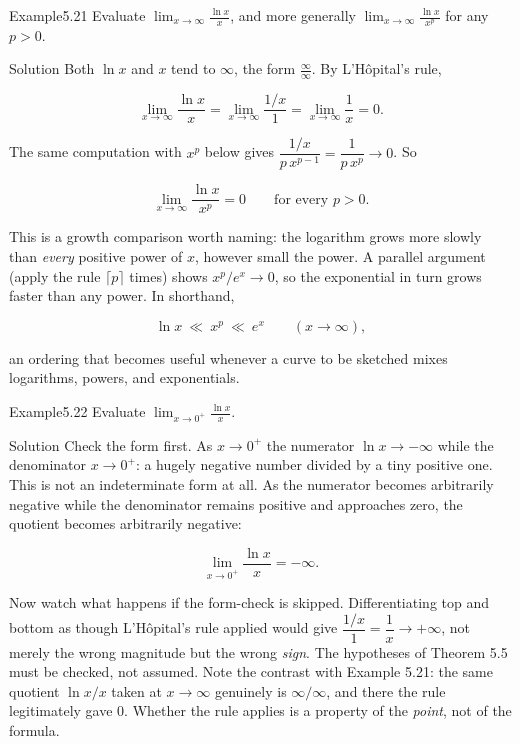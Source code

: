 \documentclass[a4paper,12pt,oneside]{memoir}
\begin{document}
\begin{workedexample}
\begin{envexample}{Example}{5.21}{}
Evaluate \(\displaystyle \lim_{x \to \infty} \frac{\ln x}{x}\), and more generally \(\displaystyle \lim_{x \to \infty} \frac{\ln x}{x^{p}}\) for any \(p > 0\).
\end{envexample}
\begin{envsolution}{Solution}{}{}
Both \(\ln x\) and \(x\) tend to \(\infty\), the form \(\tfrac{\infty}{\infty}\). By L’Hôpital’s rule,

\[ \lim_{x \to \infty} \frac{\ln x}{x} = \lim_{x \to \infty} \frac{1/x}{1} = \lim_{x \to \infty} \frac{1}{x} = 0. \]

The same computation with \(x^{p}\) below gives \(\dfrac{1/x}{p\,x^{p-1}} = \dfrac{1}{p\,x^{p}} \to 0\). So

\[ \lim_{x \to \infty} \frac{\ln x}{x^{p}} = 0 \qquad \text{for every } p > 0. \]

This is a growth comparison worth naming: the logarithm grows more slowly than \emph{every} positive power of \(x\), however small the power. A parallel argument (apply the rule \(\lceil p \rceil\) times) shows \(x^{p}/e^{x} \to 0\), so the exponential in turn grows faster than any power. In shorthand,

\[ \ln x \ \ll\ x^{p} \ \ll\ e^{x} \qquad (x \to \infty), \]

an ordering that becomes useful whenever a curve to be sketched mixes logarithms, powers, and exponentials. \qedmark
\end{envsolution}
\end{workedexample}
\begin{workedexample}
\begin{envexample}{Example}{5.22}{}
Evaluate \(\displaystyle \lim_{x \to 0^{+}} \frac{\ln x}{x}\).
\end{envexample}
\begin{envsolution}{Solution}{}{}
Check the form first. As \(x \to 0^{+}\) the numerator \(\ln x \to -\infty\) while the denominator \(x \to 0^{+}\): a hugely negative number divided by a tiny positive one. This is not an indeterminate form at all. As the numerator becomes arbitrarily negative while the denominator remains positive and approaches zero, the quotient becomes arbitrarily negative:

\[ \lim_{x \to 0^{+}} \frac{\ln x}{x} = -\infty. \]

Now watch what happens if the form-check is skipped. Differentiating top and bottom as though L’Hôpital’s rule applied would give \(\dfrac{1/x}{1} = \dfrac{1}{x} \to +\infty\), not merely the wrong magnitude but the wrong \emph{sign}. The hypotheses of Theorem 5.5 must be checked, not assumed. Note the contrast with Example 5.21: the same quotient \(\ln x / x\) taken at \(x \to \infty\) genuinely is \(\infty/\infty\), and there the rule legitimately gave \(0\). Whether the rule applies is a property of the \emph{point}, not of the formula. \qedmark
\end{envsolution}
\end{workedexample}
\end{document}
